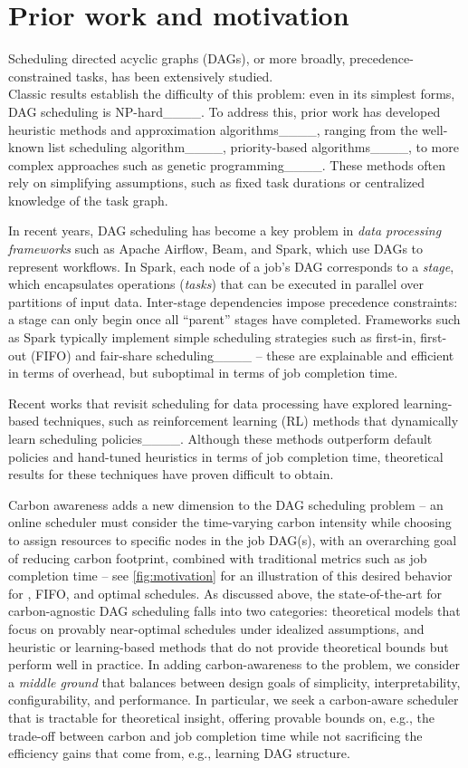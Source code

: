 \section{Prior work and motivation}
\label{sec:motiv}

Scheduling directed acyclic graphs (DAGs), or more broadly, precedence-constrained tasks, has been extensively studied.\\ 
Classic results establish the difficulty of this problem: even in its simplest forms, DAG scheduling is NP-hard____. 
To address this, prior work has developed heuristic methods and approximation algorithms____, ranging from the well-known list scheduling algorithm____, priority-based algorithms____, to more complex approaches such as genetic programming____. These methods often rely on simplifying assumptions, such as fixed task durations or centralized knowledge of the task graph.  %


In recent years, DAG scheduling has become %
a key problem in \textit{data processing frameworks} such as Apache Airflow, Beam, and Spark, which use DAGs to represent workflows. 
In Spark, each node of a job's DAG corresponds to a \textit{stage}, which encapsulates operations (\textit{tasks}) that can be executed in parallel over partitions of input data. Inter-stage dependencies impose precedence constraints: a stage can only begin once all ``parent'' stages have completed. 
Frameworks such as Spark typically implement simple scheduling strategies such as first-in, first-out (FIFO) and fair-share scheduling____ -- these are explainable and efficient in terms of overhead, but suboptimal in terms of job completion time.

Recent works that revisit scheduling %
for data processing have explored %
learning-based techniques, such as reinforcement learning (RL) methods that dynamically learn scheduling policies____.  Although these methods outperform default policies and hand-tuned heuristics in terms of job completion time, theoretical results for these techniques have proven difficult to obtain.



Carbon awareness adds a new dimension to the DAG scheduling problem -- an online scheduler must consider the time-varying carbon intensity while choosing to assign resources to specific nodes in the job DAG(s), with an overarching goal of reducing carbon footprint, combined with traditional metrics such as job completion time -- see \autoref{fig:motivation} for an illustration of this desired behavior for \DANISH, FIFO, and optimal schedules.
As discussed above, the state-of-the-art for carbon-agnostic DAG scheduling falls into two categories: theoretical models that focus on provably near-optimal schedules under idealized assumptions, and heuristic or learning-based methods that do not provide theoretical bounds but perform well in practice.
In adding carbon-awareness to the problem, we consider a \textit{middle ground} that balances between design goals of simplicity, interpretability, configurability, and performance. 
In particular, we seek a carbon-aware scheduler that is tractable for theoretical insight, offering provable bounds on, e.g., the trade-off between carbon and job completion time while not sacrificing the efficiency gains that come from, e.g., learning DAG structure.